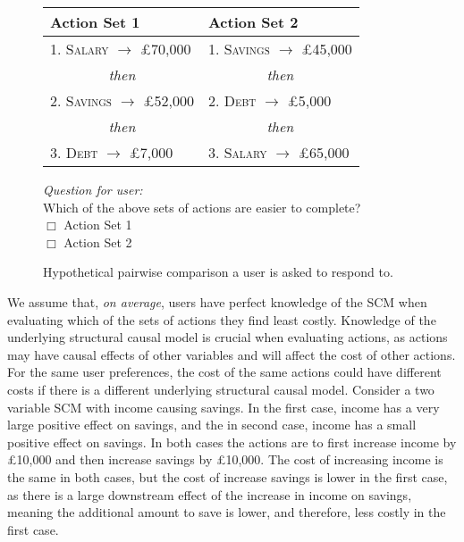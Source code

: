 \begin{figure}[!htb]
	\centering
	\begin{tabular}{l|l}
		\hline
		\textbf{Action Set 1} & \textbf{Action Set 2} \\
		\hline
		\textsc{1. Salary} $\to$ £70,000 & \textsc{1. Savings} $\to$ £45,000 \\
		\multicolumn{1}{c|}{\textit{then}} & \multicolumn{1}{c}{\textit{then}}\\
		\textsc{2. Savings} $\to$ £52,000 & \textsc{2. Debt} $\to$ £5,000 \\
		\multicolumn{1}{c|}{\textit{then}} & \multicolumn{1}{c}{\textit{then}}\\
		\textsc{3. Debt} $\to$ £7,000 & \textsc{3. Salary} $\to$ £65,000 \\ 
		\hline
	\end{tabular}
	
	\vspace{1.5em} %
	\parbox{\linewidth}{
		\centering
		\textit{Question for user:}\\
		Which of the above sets of actions are easier to complete? \\
		$\Box$ Action Set 1 \\
		$\Box$ Action Set 2
	}
	
	\caption{Hypothetical pairwise comparison a user is asked to respond to.}
	\label{fig:comparison_ui}
\end{figure}

We assume that, \textit{on average}, users have perfect knowledge of the SCM when evaluating which of the sets of actions they find least costly. Knowledge of the underlying structural causal model is crucial when evaluating actions, as actions may have causal effects of other variables and will affect the cost of other actions. For the same user preferences, the cost of the same actions could have different costs if there is a different underlying structural causal model. Consider a two variable SCM with income causing savings. In the first case, income has a very large positive effect on savings, and the in second case, income has a small positive effect on savings. In both cases the actions are to first increase income by £10,000 and then increase savings by £10,000. The cost of increasing income is the same in both cases, but the cost of increase savings is lower in the first case, as there is a large downstream effect of the increase in income on savings, meaning the additional amount to save is lower, and therefore, less costly in the first case.

